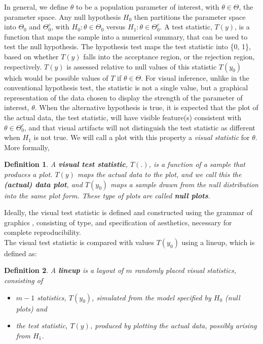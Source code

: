 \documentclass[12pt]{article}
\newtheorem{dfn}{Definition}[section]
\begin{document}
In general, we define $\theta$ to be a population parameter of interest, with $\theta \in \Theta$, the parameter space. Any null hypothesis $H_0$ then partitions the parameter space into $\Theta_0$ and $\Theta_0^c$, with $H_0: \theta \in \Theta_0$ versus $H_1: \theta \in \Theta_0^c$. A test statistic, $T(y)$, is a function that maps the sample into a numerical summary, that can be used to test the null hypothesis. The hypothesis test maps the test statistic into \{0, 1\}, based on whether $T(y)$ falls into the acceptance region, or the rejection region, respectively. $T(y)$ is assessed relative to null values of this statistic $T(y_0)$ which would be possible values of $T$ if $\theta \in \Theta$.  %
For visual inference, unlike in the conventional hypothesis test, the statistic is not a single value, but a graphical representation of the data chosen to display the strength of the parameter of interest, $\theta$. When the alternative hypothesis is true, it is expected that the plot of the actual data, the test statistic, will have visible feature(s) consistent with $\theta \in \Theta_0^c$, and that visual artifacts will not distinguish the test statistic as different when $H_1$ is not true. We will call a plot with this property a {\it visual statistic} for $\theta$. More formally, 

\begin{dfn} \label{dfn:test}
A \textbf{visual test statistic}, $T(.)$, is a function of a sample that produces a plot. $T(y)$ maps the actual data to the plot, and we call this the \textbf{(actual) data plot}, and $T(y_0)$ maps a sample drawn from the null distribution into the same plot form. These type of plots are called \textbf{null plots}. 
\end{dfn}

\noindent Ideally, the visual test statistic is defined and constructed using the grammar of graphics \citep{wilkinson:1999,hadley:2009}, consisting of type, and specification of aesthetics, necessary for complete reproducibility. \\
\noindent
The visual test statistic is compared with values $T(y_0)$ using a lineup, which is defined as:

\begin{dfn}\label{dfn:lplot}
A \textbf{lineup} is a layout of $m$ randomly placed visual statistics, consisting of 
\begin{itemize}\itemsep-3pt
\item $m-1$ statistics, $T(y_0)$, simulated from the model specified by $H_0$  (null plots) and 
\item the test statistic, $T(y)$, produced by plotting the actual data, possibly arising from $H_1$.
\end{itemize}
\end{dfn}
\end{document}
